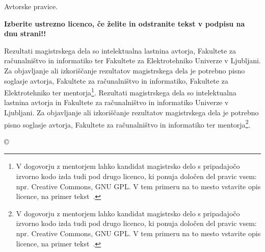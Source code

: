 \thispagestyle{empty}
\vspace*{\fill}
{\noindent\footnotesize
{\sc Avtorske pravice}.


\large \textbf{Izberite ustrezno licenco, če želite in odstranite tekst v podpisu na dnu strani!!}
 
\ifPROGRAMMM
    Rezultati magistrskega dela so intelektualna lastnina avtorja, Fakultete za ra\-ču\-nal\-niš\-tvo in informatiko ter Fakultete za Elektrotehniko Univerze v Ljubljani. Za objavljanje ali izkoriščanje rezultatov ma\-gi\-str\-ske\-ga dela je potrebno pisno soglasje avtorja, Fakultete za ra\-ču\-nal\-niš\-tvo in informatiko, Fakultete za Elektrotehniko ter mentorja\footnote{V dogovorju z mentorjem lahko kandidat magistrsko delo s pripadajočo izvorno kodo izda tudi pod drugo licenco, ki ponuja določen del pravic vsem: npr. Creative Commons, GNU GPL. V tem primeru na to mesto vstavite opis licence, na primer tekst~\cite{licence}.}.
\else
    Rezultati magistrskega dela so intelektualna lastnina avtorja in Fakultete za ra\-ču\-nal\-niš\-tvo in informatiko Univerze v Ljubljani. Za objavljanje ali izkoriščanje rezultatov ma\-gi\-str\-ske\-ga dela je potrebno pisno soglasje avtorja, Fakultete za ra\-ču\-nal\-niš\-tvo in informatiko ter mentorja\footnote{V dogovorju z mentorjem lahko kandidat magistrsko delo s pripadajočo izvorno kodo izda tudi pod drugo licenco, ki ponuja določen del pravic vsem: npr. Creative Commons, GNU GPL. V tem primeru na to mesto vstavite opis licence, na primer tekst~\cite{licence}.}.
\fi    



}
\begin{center}
{\footnotesize{\sc \copyright \myyear\ \tauthor}}
\end{center} 